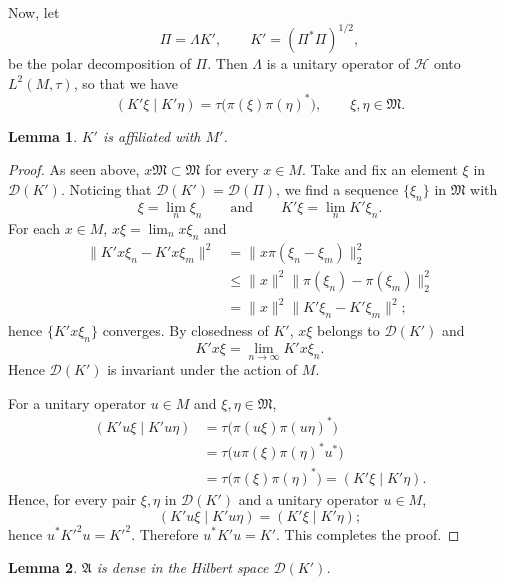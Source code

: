 \documentclass[12pt,b5paper,twoside]{article}
\theoremstyle{takesaki}
\newtheorem{lemma}{Lemma}[section]
\numberwithin{equation}{section}
\begin{document}
Now, let
\[
 \Pi=\Lambda K',
 \qquad K'=(\Pi^*\Pi)^{1/2},
\]
be the polar decomposition of $\Pi$.  Then $\Lambda$ is a unitary
operator of $\mathcal H$ onto $L^2(M,\tau)$, so that we have
\begin{equation}
 (K'\xi\mid K'\eta)=\tau\bigl(\pi(\xi)\pi(\eta)^*\bigr),
 \qquad \xi,\eta\in\mathfrak M.
 \tag{14.13}\label{eq:14.13}
\end{equation}

\begin{lemma}\label{lem:14.10}
$K'$ is affiliated with $M'$.
\end{lemma}

\begin{proof}
As seen above, $x\mathfrak M\subset\mathfrak M$ for every $x\in M$.
Take and fix an element $\xi$ in $\mathcal D(K')$.  Noticing that
$\mathcal D(K')=\mathcal D(\Pi)$, we find a sequence $\{\xi_n\}$ in
$\mathfrak M$ with
\[
 \xi=\lim_n\xi_n
 \qquad\text{and}\qquad
 K'\xi=\lim_nK'\xi_n.
\]
For each $x\in M$, $x\xi=\lim_nx\xi_n$ and
\begin{align*}
 \|K'x\xi_n-K'x\xi_m\|^2
 &=\|x\pi(\xi_n-\xi_m)\|_2^2\\
 &\leq\|x\|^2\|\pi(\xi_n)-\pi(\xi_m)\|_2^2\\
 &=\|x\|^2\|K'\xi_n-K'\xi_m\|^2;
\end{align*}
hence $\{K'x\xi_n\}$ converges.  By closedness of $K'$, $x\xi$
belongs to $\mathcal D(K')$ and
\[
 K'x\xi=\lim_{n\to\infty}K'x\xi_n.
\]
Hence $\mathcal D(K')$ is invariant under the action of $M$.

For a unitary operator $u\in M$ and $\xi,\eta\in\mathfrak M$,
\begin{align*}
 (K'u\xi\mid K'u\eta)
 &=\tau\bigl(\pi(u\xi)\pi(u\eta)^*\bigr)\\
 &=\tau\bigl(u\pi(\xi)\pi(\eta)^*u^*\bigr)\\
 &=\tau\bigl(\pi(\xi)\pi(\eta)^*\bigr)
  =(K'\xi\mid K'\eta).
\end{align*}
Hence, for every pair $\xi,\eta$ in $\mathcal D(K')$ and a unitary
operator $u\in M$,
\[
 (K'u\xi\mid K'u\eta)=(K'\xi\mid K'\eta);
\]
hence $u^*K'^2u=K'^2$.  Therefore $u^*K'u=K'$.  This completes the
proof.
\end{proof}

\begin{lemma}\label{lem:14.11}
$\mathfrak A$ is dense in the Hilbert space $\mathcal D(K')$.
\end{lemma}
\end{document}

